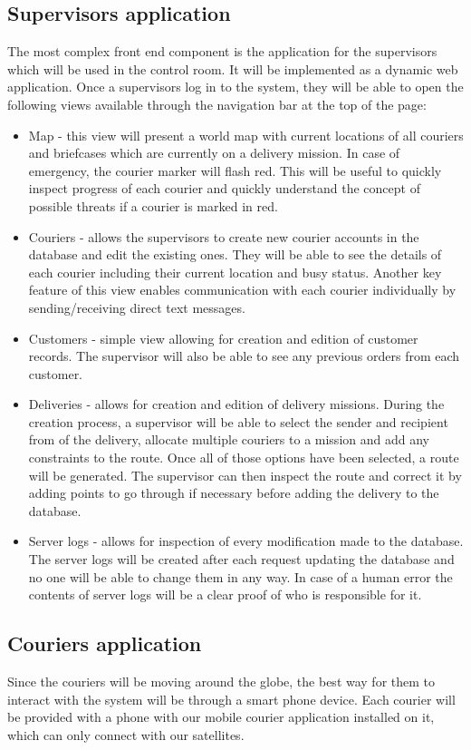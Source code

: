 \subsection{Supervisors application} \label{supervisorsarch}
The most complex front end component is the application for the supervisors which will be used in the control room. It will be implemented as a dynamic web application. Once a supervisors log in to the system, they will be able to open the following views available through the navigation bar at the top of the page:
\begin{itemize}
    \item Map - this view will present a world map with current locations of all couriers and briefcases which are currently on a delivery mission. In case of emergency, the courier marker will flash red. This will be useful to quickly inspect progress of each courier and quickly understand the concept of possible threats if a courier is marked in red.
    \item Couriers - allows the supervisors to create new courier accounts in the database and edit the existing ones. They will be able to see the details of each courier including their current location and busy status. Another key feature of this view enables communication with each courier individually by sending/receiving direct text messages.
    \item Customers - simple view allowing for creation and edition of customer records. The supervisor will also be able to see any previous orders from each customer.
    \item Deliveries - allows for creation and edition of delivery missions. During the creation process, a supervisor will be able to select the sender and recipient from of the delivery, allocate multiple couriers to a mission and add any constraints to the route. Once all of those options have been selected, a route will be generated. The supervisor can then inspect the route and correct it by adding points to go through if necessary before adding the delivery to the database.
    \item Server logs - allows for inspection of every modification made to the database. The server logs will be created after each request updating the database and no one will be able to change them in any way. In case of a human error the contents of server logs will be a clear proof of who is responsible for it. 
\end{itemize}
\subsection{Couriers application} \label{couriersarch}
Since the couriers will be moving around the globe, the best way for them to interact with the system will be through a smart phone device. Each courier will be provided with a phone with our mobile courier application installed on it, which can only connect with our satellites. 

